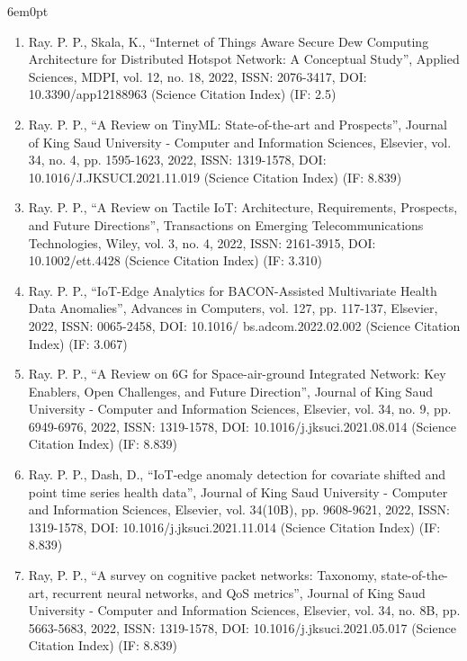 \documentclass[11pt,a4paper]{moderncv}
\begin{document}
\begin{adjustwidth}{6em}{0pt}
\begin{enumerate}
		\item Ray. P. P., Skala, K., “Internet of Things Aware Secure Dew Computing Architecture for Distributed Hotspot Network: A Conceptual Study”, Applied Sciences, MDPI, vol. 12, no. 18, 2022, ISSN: 2076-3417, DOI: 10.3390/app12188963 (Science Citation Index) (IF: 2.5)  
		
		\item Ray. P. P., “A Review on TinyML: State-of-the-art and Prospects”, Journal of King Saud University - Computer and Information Sciences, Elsevier, vol. 34, no. 4, pp. 1595-1623, 2022, ISSN: 1319-1578, DOI: 10.1016/J.JKSUCI.2021.11.019 (Science Citation Index) (IF: 8.839)
		
		\item Ray. P. P., “A Review on Tactile IoT: Architecture, Requirements, Prospects, and Future Directions”, Transactions on Emerging Telecommunications Technologies, Wiley, vol. 3, no. 4, 2022, ISSN: 2161-3915, DOI: 10.1002/ett.4428 (Science Citation Index) (IF: 3.310) 
		
		\item Ray. P. P., “IoT-Edge Analytics for BACON-Assisted Multivariate Health Data Anomalies”, Advances in Computers, vol. 127, pp. 117-137, Elsevier, 2022, ISSN: 0065-2458, DOI: 10.1016/ bs.adcom.2022.02.002 (Science Citation Index) (IF: 3.067)
		
		\item Ray. P. P., “A Review on 6G for Space-air-ground Integrated Network: Key Enablers, Open Challenges, and Future Direction”, Journal of King Saud University - Computer and Information Sciences, Elsevier, vol. 34, no. 9, pp. 6949-6976, 2022, ISSN: 1319-1578, DOI: 10.1016/j.jksuci.2021.08.014 (Science Citation Index) (IF: 8.839) 
		
		\item Ray. P. P., Dash, D., “IoT-edge anomaly detection for covariate shifted and point time series health data”, Journal of King Saud University - Computer and Information Sciences, Elsevier, vol. 34(10B), pp. 9608-9621, 2022, ISSN: 1319-1578, DOI: 10.1016/j.jksuci.2021.11.014 (Science Citation Index) (IF: 8.839) 
		
		\item Ray, P. P., “A survey on cognitive packet networks: Taxonomy, state-of-the-art, recurrent neural networks, and QoS metrics”, Journal of King Saud University - Computer and Information Sciences, Elsevier, vol. 34, no. 8B, pp. 5663-5683, 2022, ISSN: 1319-1578, DOI: 10.1016/j.jksuci.2021.05.017 (Science Citation Index) (IF: 8.839) 
		

\end{enumerate}
\end{adjustwidth}
\end{document}
